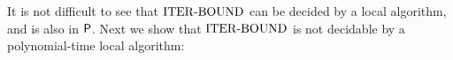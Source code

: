 	It is not difficult to see that ${\mathrm{ITER\text{-}BOUND}}$ can be decided by a local algorithm,
and is also in ${\mathsf{P}}$.
Next we show that ${\mathrm{ITER\text{-}BOUND}}$ is not decidable by a polynomial-time local algorithm:



